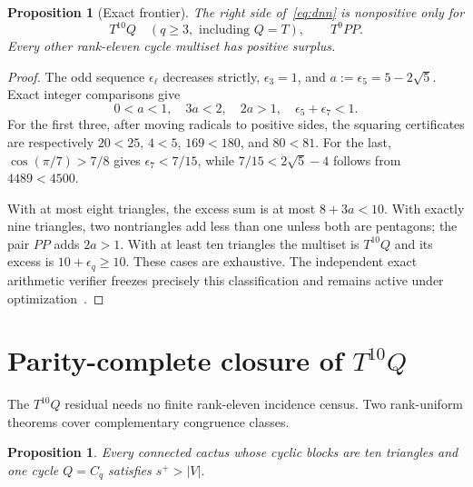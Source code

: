\documentclass[11pt]{article}
\newtheorem{proposition}[theorem]{Proposition}
\theoremstyle{remark}
\newcommand{\spE}{s^+}
\begin{document}
\begin{proposition}[Exact frontier]\label{prop:frontier}
The right side of~\eqref{eq:dnn} is nonpositive only for
\[
 T^{10}Q\quad(q\geq3,\text{ including }Q=T),
 \qquad T^9PP.
\]
Every other rank-eleven cycle multiset has positive surplus.
\end{proposition}

\begin{proof}
The odd sequence $\epsilon_\ell$ decreases strictly,
$\epsilon_3=1$, and $a:=\epsilon_5=5-2\sqrt5$.  Exact integer comparisons give
\[
 0<a<1,\quad3a<2,\quad2a>1,\quad
 \epsilon_5+\epsilon_7<1.
\]
For the first three, after moving radicals to positive sides, the squaring
certificates are respectively $20<25$, $4<5$, $169<180$, and $80<81$.
For the last, $\cos(\pi/7)>7/8$ gives $\epsilon_7<7/15$, while
$7/15<2\sqrt5-4$ follows from $4489<4500$.

With at most eight triangles, the excess sum is at most $8+3a<10$.  With
exactly nine triangles, two nontriangles add less than one unless both are
pentagons; the pair $PP$ adds $2a>1$.  With at least ten triangles the multiset
is $T^{10}Q$ and its excess is $10+\epsilon_q\geq10$.  These cases are
exhaustive.  The independent exact arithmetic verifier freezes precisely this
classification and remains active under optimization~\cite{Frontier}.
\end{proof}

\section{Parity-complete closure of \texorpdfstring{$T^{10}Q$}{T10Q}}

The $T^{10}Q$ residual needs no finite rank-eleven incidence census.  Two
rank-uniform theorems cover complementary congruence classes.

\begin{proposition}\label{prop:t10q}
Every connected cactus whose cyclic blocks are ten triangles and one cycle
$Q=C_q$ satisfies $\spE>|V|$.
\end{proposition}
\end{document}
